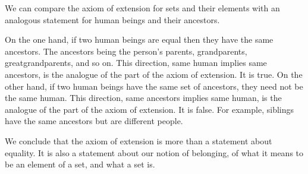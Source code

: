 %
%
%
%


We can compare the axiom of extension
for sets and their elements with an
analogous statement
for human beings and their ancestors.

On the one hand, if two human beings are equal then they have the same ancestors.
The ancestors being the person's parents, grandparents, greatgrandparents, and so on.
This direction, same human implies same ancestors, is the analogue of the  part of the axiom of extension.
It is true.
On the other hand, if two human beings have the same set of ancestors, they need not be the same human.
This direction, same ancestors implies same human, is the analogue of the  part of the axiom of extension.
It is false.
For example, siblings have the same ancestors but are different people.

We conclude that the axiom of extension
is more than a statement about equality.
It is also a statement about our notion of
belonging, of what it means
to be an element of a set, and what a set is.

\blankpage
